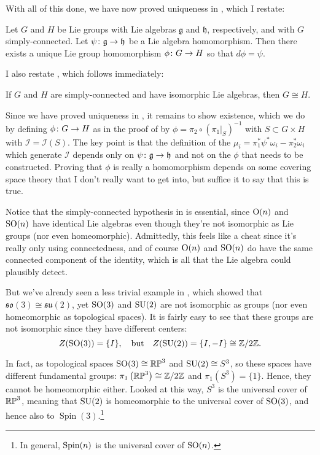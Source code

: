 With all of this done, we have now proved uniqueness in , which I restate:

\begin{theorem*}
	Let $G$ and $H$ be Lie groups with Lie algebras $\mathfrak{g}$ and $\mathfrak{h}$, respectively, and with $G$ simply-connected. Let $\psi \colon\thinspace\! \mathfrak{g} \to \mathfrak{h}$ be a Lie algebra homomorphism. Then there exists a unique Lie group homomorphism $\phi \colon\thinspace\! G \to H$ so that $d\phi = \psi$.
\end{theorem*}

I also restate , which follows immediately:
\begin{corollary*}
	If $G$ and $H$ are simply-connected and have isomorphic Lie algebras, then $G \cong H$.
\end{corollary*}

Since we have proved uniqueness in , it remains to show existence, which we do by defining $\phi \colon\thinspace\! G \to H$ as in the proof of  by $\phi = \pi_2 \circ \left(\left. \pi_1\right|_S\right)^{-1}$ with $S \subset G \times H$ with $\mathcal{I} = \mathcal{I}(S)$. The key point is that the definition of the $\mu_i = \pi_1^\ast \psi^\ast \omega_i - \pi_2^\ast \omega_i$ which generate $\mathcal{I}$ depends only on $\psi \colon\thinspace\! \mathfrak{g} \to \mathfrak{h}$ and not on the $\phi$ that needs to be constructed. Proving that $\phi$ is really a homomorphism depends on some covering space theory that I don't really want to get into, but suffice it to say that this is true.

Notice that the simply-connected hypothesis in  is essential, since $\operatorname{O}(n)$ and $\operatorname{SO}(n)$ have identical Lie algebras even though they're not isomorphic as Lie groups (nor even homeomorphic). Admittedly, this feels like a cheat since it's really only using connectedness, and of course $\operatorname{O}(n)$ and $\operatorname{SO}(n)$ do have the same connected component of the identity, which is all that the Lie algebra could plausibly detect.

But we've already seen a less trivial example in , which showed that $\mathfrak{so}(3) \cong \mathfrak{su}(2)$, yet $\operatorname{SO}(3)$ and $\operatorname{SU}(2)$ are not isomorphic as groups (nor even homeomorphic as topological spaces). It is fairly easy to see that these groups are not isomorphic since they have different centers:
\[
	Z(\operatorname{SO}(3)) = \{I\}, \quad \text{but} \quad Z(\operatorname{SU}(2)) = \{I, -I\} \cong \mathbb{Z}/2\mathbb{Z}.
\]

In fact, as topological spaces $\operatorname{SO}(3) \cong \mathbb{RP}^3$ and $\operatorname{SU}(2) \cong S^3$, so these spaces have different fundamental groups: $\pi_1\left(\mathbb{RP}^3\right) \cong \mathbb{Z}/2\mathbb{Z}$ and $\pi_1\left(S^3\right) = \{1\}$. Hence, they cannot be homeomorphic either. Looked at this way, $S^3$ is the universal cover of $\mathbb{RP}^3$, meaning that $\operatorname{SU}(2)$ is homeomorphic to the universal cover of $\operatorname{SO}(3)$, and hence also to $\operatorname{Spin}(3)$.\footnote{In general, $\operatorname{Spin}(n)$ is the universal cover of $\operatorname{SO}(n)$.}